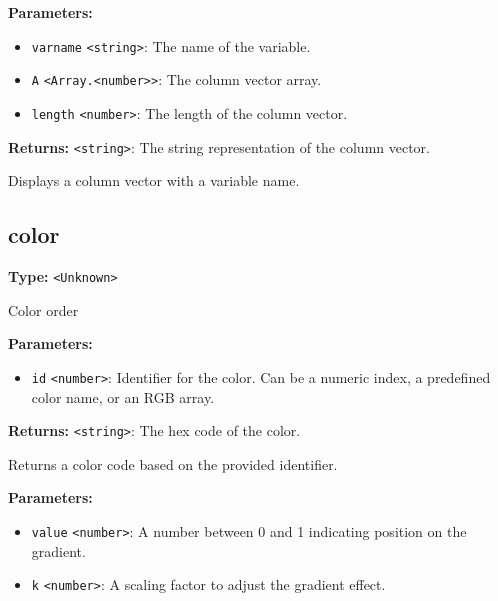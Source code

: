 \documentclass[12pt,a4paper]{article}
\begin{document}
\noindent \textbf{Parameters:}
\begin{itemize}
  \item \texttt{varname} \texttt{<string>}: The name of the variable.
  \item \texttt{A} \texttt{<Array.<number>>}: The column vector array.
  \item \texttt{length} \texttt{<number>}: The length of the column vector.
\end{itemize}

\noindent \textbf{Returns:} \texttt{<string>}: The string representation of the column vector.

\noindent Displays a column vector with a variable name.


\subsection{color}
\vspace{5mm}
\noindent {}\vspace{4mm}


\noindent \textbf{Type:} \texttt{<Unknown>}

\noindent Color order

\vspace{5mm}
\noindent {}


\noindent \textbf{Parameters:}
\begin{itemize}
  \item \texttt{id} \texttt{<number>}: Identifier for the color. Can be a numeric index, a predefined color name, or an RGB array.
\end{itemize}

\noindent \textbf{Returns:} \texttt{<string>}: The hex code of the color.

\noindent Returns a color code based on the provided identifier.

\vspace{5mm}
\noindent {}


\noindent \textbf{Parameters:}
\begin{itemize}
  \item \texttt{value} \texttt{<number>}: A number between 0 and 1 indicating position on the gradient.
  \item \texttt{k} \texttt{<number>}: A scaling factor to adjust the gradient effect.
\end{itemize}
\end{document}
